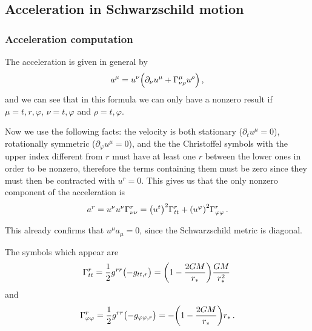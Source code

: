 \documentclass[main.tex]{subfiles}
\begin{document}
\subsection{Acceleration in Schwarzschild motion}

\subsubsection{Acceleration computation}

The acceleration is given in general by 
%
\begin{align}
  a^{\mu } = u^{\nu } \qty(\partial_{\nu } u^{\mu } + \Gamma^{\mu  }_{\nu \rho } u^{\rho })
\,,
\end{align}
%
and we can see that in this formula we can only have a nonzero result if \(\mu = t, r, \varphi \), \(\nu = t, \varphi \) and \(\rho = t, \varphi \). 

Now we use the following facts: the velocity is both stationary (\(\partial_{t} u^{\mu } = 0\)), rotationally symmetric (\(\partial_{\varphi } u^{\mu } = 0\)), and the the Christoffel symbols with the upper index different from \(r\) must have at least one \(r\) between the lower ones in order to be nonzero, therefore the terms containing them must be zero since they must then be contracted with \(u^{r} =0 \).
This gives us that the only nonzero component of the acceleration is 
%
\begin{align}
  a^{r } = u^{\nu } u^{\nu } \Gamma^{r}_{\nu \nu }
  = \qty(u^{t})^2 \Gamma^{r}_{tt} + \qty(u^{\varphi })^2 \Gamma^{r}_{\varphi \varphi }
\,.
\end{align}

This already confirms that \(u^{\mu } a_{\mu } =0\), since the Schwarzschild metric is diagonal.

The symbols which appear are 
%
\begin{align}
  \Gamma^{r}_{tt} = \frac{1}{2} g^{rr} \qty(- g_{tt, r})
  = \qty(1 - \frac{2GM}{r_{*}}) \frac{GM}{r^2_{*}}
\,
\end{align}
%
and 
%
\begin{align}
  \Gamma^{r}_{\varphi  \varphi } = 
  \frac{1}{2} g^{rr} \qty(-g_{\varphi \varphi , r})
  = - \qty(1 - \frac{2GM}{r_{*}}) r_{*} 
\,.
\end{align}
\end{document}
